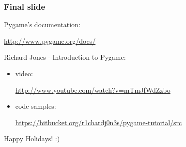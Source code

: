 \documentclass[]{beamer}   %
\begin{document}


\begin{frame}
\frametitle{Final slide}

Pygame's documentation: 
\begin{center}
\url{http://www.pygame.org/docs/}
\end{center}
\vspace{0.8cm}
Richard Jones - Introduction to Pygame:
\medskip
\begin{itemize}
\item[] video:
\begin{center}
\footnotesize\url{http://www.youtube.com/watch?v=mTmJfWdZzbo}
\end{center}
\item[] code samples: 
\begin{center}
\footnotesize\url{https://bitbucket.org/r1chardj0n3s/pygame-tutorial/src}
\end{center}
\end{itemize}
\vspace{0.8cm}
Happy Holidays! :)
\end{frame}


\end{document}
